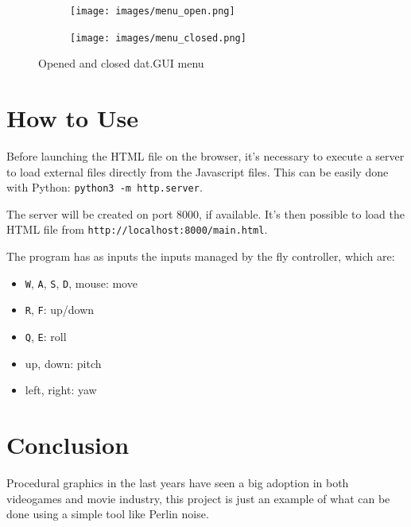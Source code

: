 \documentclass[paper=a4, fontsize=11pt]{scrartcl} %
\numberwithin{equation}{section} %
\numberwithin{figure}{section} %
\numberwithin{table}{section} %
\theoremstyle{definition}
\begin{document}
\begin{figure}
	\centering
	\begin{subfigure}{.4\textwidth}
		\centering
		\texttt{[image: images/menu\_open.png]}
	\end{subfigure}
	\begin{subfigure}{.4\textwidth}
		\centering
		\texttt{[image: images/menu\_closed.png]}
	\end{subfigure}
	\caption{Opened and closed dat.GUI menu}
	\label{fig:menu}
\end{figure}


\section{How to Use}

Before launching the HTML file on the browser, it's necessary to execute a
server to load external files directly from the Javascript files. This can be
easily done with Python: \texttt{python3 -m http.server}.

The server will be created on port 8000, if available. It's then possible
to load the HTML file from \texttt{http://localhost:8000/main.html}.

The program has as inputs the inputs managed by the fly controller, which are:

\begin{itemize}
	\item \texttt{W}, \texttt{A}, \texttt{S}, \texttt{D}, mouse: move
	\item \texttt{R}, \texttt{F}: up/down
	\item \texttt{Q}, \texttt{E}: roll
	\item up, down: pitch
	\item left, right: yaw
\end{itemize}


\section{Conclusion}

Procedural graphics in the last years have seen a big adoption in both videogames
and movie industry, this project is just an example of what can be done using
a simple tool like Perlin noise.
\end{document}
